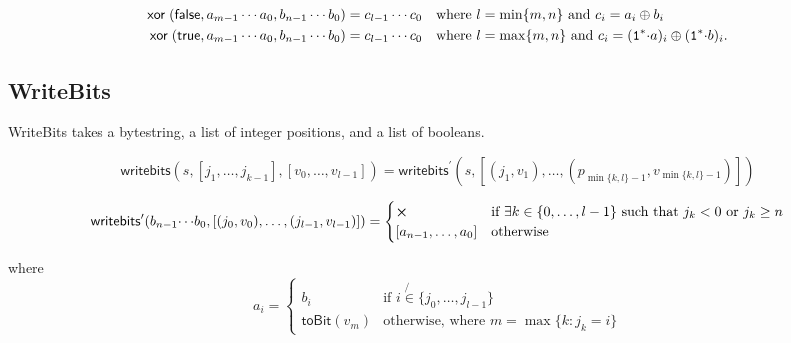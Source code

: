 \begin{align*}
\mathsf{xor}\;(\mathsf{false}, a_{m-1} \cdots a_0, b_{n-1} \cdots b_0) &= c_{l-1} \cdots c_0 
\quad \text{where $l=\min\{m,n\}$ and $c_i = a_i \oplus b_i$}\\
\mathsf{xor}\;(\mathsf{true}, a_{m-1} \cdots a_0, b_{n-1} \cdots b_0) &= c_{l-1} \cdots c_0 
\quad \text{where $l=\max\{m,n\}$ and $c_i = (\mathtt{1}^*{\cdot}a)_i \oplus (\mathtt{1}^*{\cdot}b)_i$.}
\end{align*}

\subsection{WriteBits}
WriteBits takes a bytestring, a list of integer positions, and a list of booleans.

$$
\mathsf{writebits}(s, [j_1 , \ldots, j_{k-1}], [v_0, \ldots, v_{l-1}]) =
    \mathsf{writebits}^{\prime} (s, [(j_1, v_1) , \ldots, (p_{\min\{k,l\}-1}, v_{\min\{k,l\}-1})])
$$

$$
\mathsf{writebits}^{\prime}(b_{n-1}{\cdots}b_0, [(j_0,v_0), \ldots, (j_{l-1}, v_{l-1})]) = 
\begin{cases}
\errorX & \text{if $\exists k \in \{0, \ldots, l-1\}$ such that $j_k<0$ or $j_k \geq n$} \\
[a_{n-1}, \ldots, a_0] & \text{otherwise}
\end{cases}
$$

where
$$
  a_i =
  \begin{cases}
    b_i & \text{if $i \not{\in} \{j_0, \ldots, j_{l-1}\}$}\\
    \mathsf{toBit}(v_m) & \text{otherwise, where $m = \max\{k : j_k = i\}$}
  
  \end{cases}
$$

